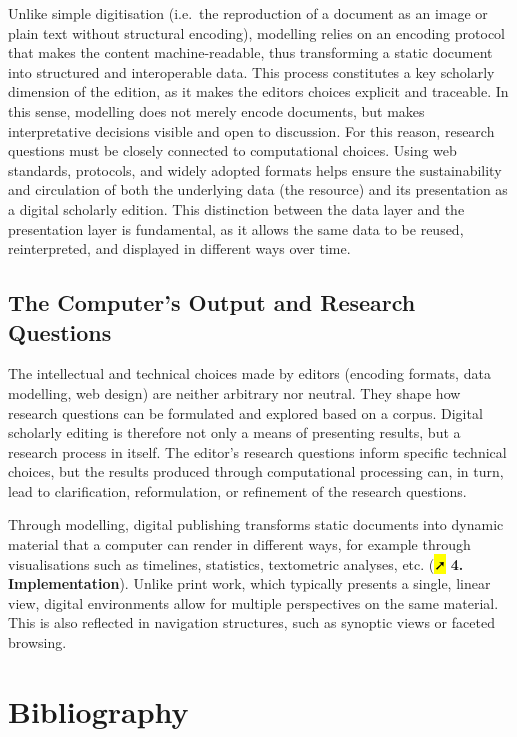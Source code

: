 \documentclass[
  letterpaper,
  DIV=11,
  numbers=noendperiod]{scrreprt}
\begin{document}
Unlike simple digitisation (i.e.~the reproduction of a document as an
image or plain text without structural encoding), modelling relies on an
encoding protocol that makes the content machine-readable, thus
transforming a static document into structured and interoperable data.
This process constitutes a key scholarly dimension of the edition, as it
makes the editor\textquotesingle s choices explicit and traceable. In
this sense, modelling does not merely encode documents, but makes
interpretative decisions visible and open to discussion. For this
reason, research questions must be closely connected to computational
choices. Using web standards, protocols, and widely adopted formats
helps ensure the sustainability and circulation of both the underlying
data (the resource) and its presentation as a digital scholarly edition.
This distinction between the data layer and the presentation layer is
fundamental, as it allows the same data to be reused, reinterpreted, and
displayed in different ways over time.

\subsection{The Computer's Output and Research
Questions}\label{the-computers-output-and-research-questions}

The intellectual and technical choices made by editors (encoding
formats, data modelling, web design) are neither arbitrary nor neutral.
They shape how research questions can be formulated and explored based
on a corpus. Digital scholarly editing is therefore not only a means of
presenting results, but a research process in itself. The editor's
research questions inform specific technical choices, but the results
produced through computational processing can, in turn, lead to
clarification, reformulation, or refinement of the research questions.

Through modelling, digital publishing transforms static documents into
dynamic material that a computer can render in different ways, for
example through visualisations such as timelines, statistics,
textometric analyses, etc. (\hl{➚} \textbf{4. Implementation}). Unlike
print work, which typically presents a single, linear view, digital
environments allow for multiple perspectives on the same material. This
is also reflected in navigation structures, such as synoptic views or
faceted browsing.

\section{Bibliography}\label{bibliography}
\end{document}
